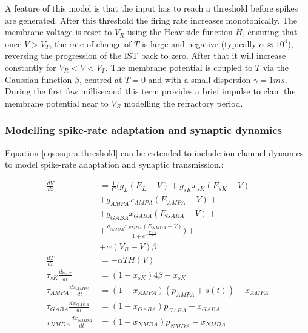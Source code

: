 		A feature of this model is that the input has to reach a threshold before spikes are generated.
		After this threshold the firing rate increases monotonically.
		The membrane voltage is reset to $V_R$ using the Heaviside function $H$, ensuring that once $V>V_T$, the rate of change of $T$ is large and negative (typically $\alpha\approx 10^4$), reversing the progression of the IST back to zero.
		After that it will increase constantly for $V_R<V<V_T$.
		The membrane potential is coupled to $T$ via the Gaussian function $\beta$, centred at $T=0$ and with a small dispersion $\gamma=1ms$.
		During the first few millisecond this term provides a brief impulse to clam the membrane potential near to $V_R$ modelling the refractory period.

		\subsubsection{Modelling spike-rate adaptation and synaptic dynamics}
		Equation \ref{eqs:supra-threshold} can be extended to include ion-channel dynamics to model spike-rate adaptation and synaptic transmission.:

		\begin{equation}
			\begin{aligned}
				\frac{dV}{dt} &= \frac{1}{C}\biggl(g_L(E_L-V)+g_{sK}x_{sK}(E_{sK}-V) +\\
				& +g_{\scriptscriptstyle{AMPA}}x_{\scriptscriptstyle{AMPA}}(E_{\scriptscriptstyle{AMPA}}-V) +\\
				& +g_{\scriptscriptstyle{GABA}}x_{\scriptscriptstyle{GABA}}(E_{\scriptscriptstyle{GABA}}-V) +\\
				& +\frac{g_{\scriptscriptstyle{NMDA}}x_{\scriptscriptstyle{NMDA}}(E_{\scriptscriptstyle{NMDA}}-V)}{1+e^{-\frac{V-a}{b}}}\biggr)+\\
				& + \alpha(V_R-V)\beta\\
				\frac{dT}{dt} &= -\alpha TH(V)\\
				\tau_{sK}\frac{dx_{sK}}{dt} &= (1-x_{sK})4\beta-x_{sK}\\
				\tau_{\scriptscriptstyle{AMPA}}\frac{dx_{\scriptscriptstyle{AMPA}}}{dt} &= (1-x_{\scriptscriptstyle{AMPA}})(p_{\scriptscriptstyle{AMPA}}+s(t))-x_{\scriptscriptstyle{AMPA}}\\
				\tau_{\scriptscriptstyle{GABA}}\frac{dx_{\scriptscriptstyle{GABA}}}{dt} &= (1-x_{\scriptscriptstyle{GABA}})p_{\scriptscriptstyle{GABA}}-x_{\scriptscriptstyle{GABA}}\\
				\tau_{\scriptscriptstyle{NMDA}}\frac{dx_{\scriptscriptstyle{NMDA}}}{dt} &= (1-x_{\scriptscriptstyle{NMDA}})p_{\scriptscriptstyle{NMDA}}-x_{\scriptscriptstyle{NMDA}}\\
				\label{eqs:synaptic-dynamics}
			\end{aligned}
		\end{equation}

